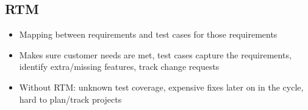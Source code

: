 \documentclass{article}
\begin{document}
\subsection{RTM}
\begin{itemize}
    \item Mapping between requirements and test cases for those requirements
    
    \item Makes sure customer needs are met, test cases capture the requirements, identify extra/missing features, track change requests
    
    \item Without RTM: unknown test coverage, expensive fixes later on in the cycle, hard to plan/track projects
\end{itemize}
\end{document}

